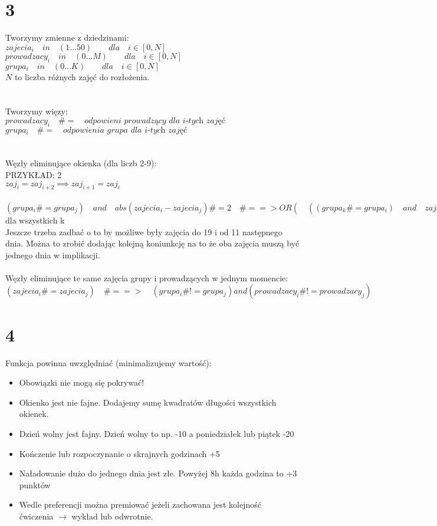 \documentclass{article}
\begin{document}
\section{3}
Tworzymy zmienne z dziedzinami:\\
$zajecia_i \quad in \quad (1\dots 50)\quad \quad dla \quad i\in[0,N]$\\
$prowadzacy_i \quad in \quad (0\dots M) \quad \quad dla \quad i\in[0,N]$\\
$grupa_i \quad in \quad (0\dots K) \quad \quad dla \quad i\in[0,N]$\\
$N$ to liczba różnych zajęć do rozłożenia.\\
\\\\Tworzymy więzy:\\
$prowadzacy_i \quad \#= \quad \textit{odpowieni prowadzący dla i-tych zajęć}$\\
$grupa_i \quad \#= \quad \textit{odpowienia grupa dla i-tych zajęć}$\\\\
\\Węzły eliminujące okienka (dla liczb 2-9):\\PRZYKŁAD: 2\\
$zaj_i = zaj_{i+2} \implies zaj_{i+1} = zaj_i$\\\\
$(grupa_i \#= grupa_j) \quad and\quad  abs(zajecia_i - zajecia_j) \#= 2 \quad \#==> OR(\quad ((grupa_k \#= grupa_i) \quad and \quad zajecia_k \#= \quad min(zajecia_i,zajecia_j) + 1))$  dla wszystkich k
 \\
Jeszcze trzeba zadbać o to by możliwe były zajęcia do 19 i od 11 następnego dnia. Można to zrobić dodając kolejną koniunkcję na to że oba zajęcia muszą być jednego dnia w implikacji.
\\\\Węzły eliminujące te same zajęcia grupy i prowadzących w jednym momencie:\\
$(zajecia_i \#= zajecia _j) \quad \#==> \quad (grupa_i \#!= grupa_j) and (prowadzacy_i \#!= prowadzacy_j)$
\section{4}
Funkcja powinna uwzględniać (minimalizujemy wartość):\\
\begin{itemize}
  \item Obowiązki nie mogą się pokrywać!
  \item Okienko jest nie fajne. Dodajemy sumę kwadratów  długości wszystkich okienek.
  \item Dzień wolny jest fajny. Dzień wolny to np. -10 a poniedziałek lub piątek -20
  \item Kończenie lub rozpoczynanie o skrajnych godzinach +5
  \item Naładowanie dużo do jednego dnia jest złe. Powyżej 8h każda godzina to +3 punktów
  \item Wedle preferencji można premiować jeżeli zachowana jest kolejność \\ćwiczenia $\rightarrow$ wykład lub odwrotnie.
\end{itemize}
\end{document}
